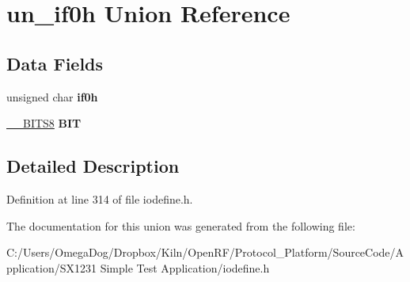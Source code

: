 \hypertarget{unionun__if0h}{\section{un\-\_\-if0h Union Reference}
\label{unionun__if0h}
}
\subsection*{Data Fields}
\begin{DoxyCompactItemize}
\item 
\hypertarget{unionun__if0h_a693ae2b3987bbe0fd20c629897f65b26}{unsigned char {\bfseries if0h}}\label{unionun__if0h_a693ae2b3987bbe0fd20c629897f65b26}

\item 
\hypertarget{unionun__if0h_ae3f4d9a39a94079bf1d71f1e553b07c7}{\hyperlink{struct_____b_i_t_s8}{\-\_\-\-\_\-\-B\-I\-T\-S8} {\bfseries B\-I\-T}}\label{unionun__if0h_ae3f4d9a39a94079bf1d71f1e553b07c7}

\end{DoxyCompactItemize}


\subsection{Detailed Description}


Definition at line 314 of file iodefine.\-h.



The documentation for this union was generated from the following file\-:\begin{DoxyCompactItemize}
\item 
C\-:/\-Users/\-Omega\-Dog/\-Dropbox/\-Kiln/\-Open\-R\-F/\-Protocol\-\_\-\-Platform/\-Source\-Code/\-Application/\-S\-X1231 Simple Test Application/iodefine.\-h\end{DoxyCompactItemize}
